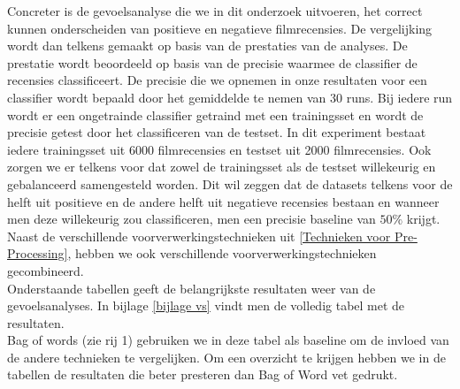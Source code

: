 Concreter is de gevoelsanalyse die we in dit onderzoek uitvoeren, het correct kunnen onderscheiden van positieve en negatieve filmrecensies. De vergelijking wordt dan telkens gemaakt op basis van de prestaties van de analyses. De prestatie wordt beoordeeld op basis van de precisie waarmee de classifier de recensies classificeert. De precisie die we opnemen in onze resultaten voor een classifier wordt bepaald door het gemiddelde te nemen van 30 runs. Bij iedere run wordt er een ongetrainde classifier getraind met een trainingsset en wordt de precisie getest door het classificeren van de testset. In dit experiment bestaat iedere trainingsset uit 6000 filmrecensies en testset uit 2000 filmrecensies. Ook zorgen we er telkens voor dat zowel de trainingsset als de testset willekeurig en gebalanceerd samengesteld worden. Dit wil zeggen dat de datasets telkens voor de helft uit positieve en de andere helft uit negatieve recensies bestaan en wanneer men deze willekeurig zou classificeren, men een precisie baseline van $50\%$ krijgt.\\

Naast de verschillende voorverwerkingstechnieken uit \ref{Technieken voor Pre-Processing}, hebben we ook verschillende voorverwerkingstechnieken gecombineerd.\\
Onderstaande tabellen geeft de belangrijkste resultaten weer van de gevoelsanalyses. In bijlage \ref{bijlage vs} vindt men de volledig tabel met de resultaten. \\ 
Bag of words (zie rij 1) gebruiken we in deze tabel als baseline om de invloed van de andere technieken te vergelijken. Om een overzicht te krijgen hebben we in de tabellen de resultaten die beter presteren dan Bag of Word vet gedrukt. 

